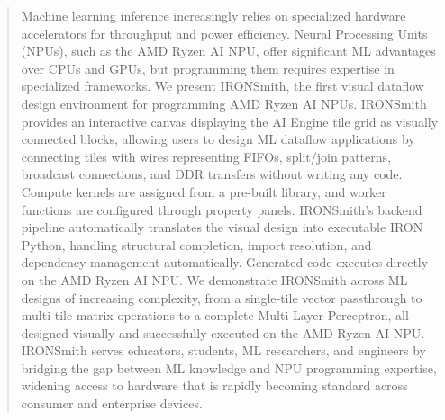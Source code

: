 \begin{abstract}
\vspace{-3mm}
Machine learning inference increasingly relies on specialized hardware accelerators for throughput and power efficiency. Neural Processing Units (NPUs), such as the AMD Ryzen AI NPU, offer significant ML advantages over CPUs and GPUs, but programming them requires expertise in specialized frameworks. 
We present IRONSmith, the first visual dataflow design environment for programming AMD Ryzen AI NPUs. IRONSmith provides an interactive canvas displaying the AI Engine tile grid as visually connected blocks, allowing users to design ML dataflow applications by connecting tiles with wires representing FIFOs, split/join patterns, broadcast connections, and DDR transfers without writing any code. Compute kernels are assigned from a pre-built library, and worker functions are configured through property panels.
IRONSmith's backend pipeline automatically translates the visual design into executable IRON Python, handling structural completion, import resolution, and dependency management automatically. Generated code executes directly on the AMD Ryzen AI NPU. We demonstrate IRONSmith across ML designs of increasing complexity, from a single-tile vector passthrough to multi-tile matrix operations to a complete Multi-Layer Perceptron, all designed visually and successfully executed on the AMD Ryzen AI NPU. IRONSmith serves educators, students, ML researchers, and engineers by bridging the gap between ML knowledge and NPU programming expertise, widening access to hardware that is rapidly becoming standard across consumer and enterprise devices. 
\vspace{-3mm}
\end{abstract}


